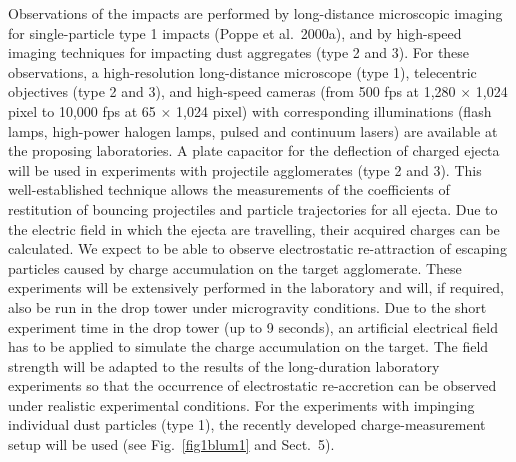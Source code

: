 Observations of the impacts are performed by long-distance
microscopic imaging for single-particle type 1 impacts (Poppe et
al.~2000a), and by high-speed imaging techniques for impacting
dust aggregates (type 2 and 3). For these observations, a
high-resolution long-distance microscope (type 1), telecentric
objectives (type 2 and 3), and high-speed cameras (from 500 fps at
1,280 $\times$ 1,024 pixel to 10,000 fps at 65 $\times$ 1,024
pixel) with corresponding illuminations (flash lamps, high-power
halogen lamps, pulsed and continuum lasers) are available at the
proposing laboratories. A plate capacitor for the deflection of
charged ejecta will be used in experiments with projectile
agglomerates (type 2 and 3). This well-established technique
allows the measurements of the coefficients of restitution of
bouncing projectiles and particle trajectories for all ejecta. Due
to the electric field in which the ejecta are travelling, their
acquired charges can be calculated. We expect to be able to
observe electrostatic re-attraction of escaping particles caused
by charge accumulation on the target agglomerate. These
experiments will be extensively performed in the laboratory and
will, if required, also be run in the drop tower under
microgravity conditions. Due to the short experiment time in the
drop tower (up to 9 seconds), an artificial electrical field has
to be applied to simulate the charge accumulation on the target.
The field strength will be adapted to the results of the
long-duration laboratory experiments so that the occurrence of
electrostatic re-accretion can be observed under realistic
experimental conditions. For the experiments with impinging
individual dust particles (type 1), the recently developed
charge-measurement setup will be used (see Fig.\ \ref{fig1blum1}
and Sect.\ 5).

